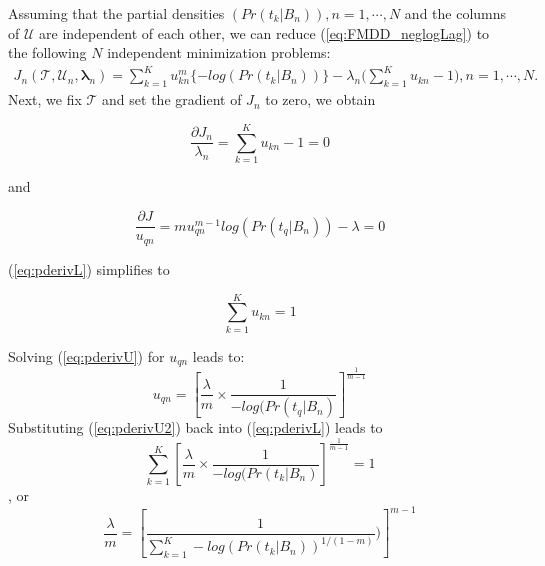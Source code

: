 \documentclass[12pt,dvips]{report}
\numberwithin{equation}{section}
\begin{document}
Assuming that the partial densities $(Pr(t_{k}\vert B_{n})), n$$=$$1, \cdots, N$ and the columns of $\mathcal{U}$ are independent of each other, we can reduce (\ref {eq:FMDD_neglogLag}) to the following $N$ independent minimization problems:
\begin{eqnarray}  \label{eq:FMDD_neglogLagRed}
J_n (\mathcal{T}, \mathcal{U}_n, \mathbf \lambda_n)  =  \sum_{k=1}^{K} u_{kn}^{m} \{-log(Pr(t_{k}\vert B_{n}))\} - \lambda_{n} \big( \sum_{k=1}^{K} u_{kn}-1 \big), n=1, \cdots, N.
\end{eqnarray}
Next, we fix $\mathcal{T}$ and set the gradient of $J_n$  to zero, we obtain

\begin{equation} \label{eq:pderivL}
\frac{\partial J_{n}}{\lambda_{n}}= \sum_{k=1}^{K} u_{kn}-1=0 
\end{equation}

and

\begin{equation} \label{eq:pderivU}
\frac{\partial J}{u_{qn}}= m u_{qn}^{m-1}log(Pr(t_{q}\vert B_{n}))-\lambda=0  
\end{equation}

(\ref{eq:pderivL}) simplifies to 

\begin{equation} \label{eq:pderivL2}
\sum_{k=1}^{K} u_{kn}=1 
\end{equation}

Solving (\ref{eq:pderivU}) for $u_{qn}$ leads to:
\begin{equation} \label{eq:pderivU2}
 u_{qn}=\left[\frac{\lambda}{m}\times\frac{1}{-log(Pr(t_{q}\vert B_{n})}\right]^{\frac{1}{m-1}}
\end{equation}
 Substituting (\ref{eq:pderivU2}) back into (\ref {eq:pderivL}) leads to 
\begin{equation} \label{eq:pderivsub1}
\sum_{k=1}^{K} \left[\frac{\lambda}{m}\times\frac{1}{-log(Pr(t_{k}\vert B_{n})}\right]^{\frac{1}{m-1}}=1
\end{equation}, or
\begin{equation} \label{eq:pderivsub2}
\frac{\lambda}{m}=\left[\frac{1}{\sum_{k=1}^{K} -log(Pr(t_k \vert  B_n))^{1/(1-m)}})\right]^{m-1}
\end{equation}
\end{document}
